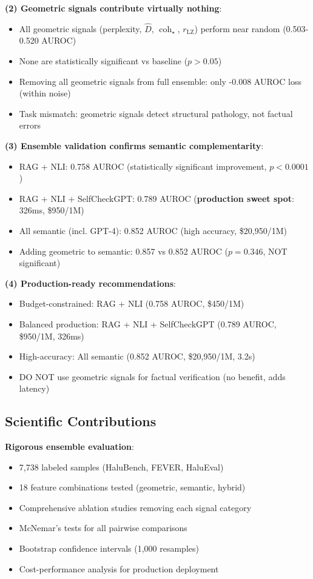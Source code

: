 \documentclass[11pt]{article}
\begin{document}
\textbf{(2) Geometric signals contribute virtually nothing}:
\begin{itemize}
\item All geometric signals (perplexity, $\hat{D}$, $\operatorname{coh}_\star$, $r_{\text{LZ}}$) perform near random (0.503-0.520 AUROC)
\item None are statistically significant vs baseline ($p > 0.05$)
\item Removing all geometric signals from full ensemble: only -0.008 AUROC loss (within noise)
\item Task mismatch: geometric signals detect structural pathology, not factual errors
\end{itemize}

\textbf{(3) Ensemble validation confirms semantic complementarity}:
\begin{itemize}
\item RAG + NLI: 0.758 AUROC (statistically significant improvement, $p < 0.0001$)
\item RAG + NLI + SelfCheckGPT: 0.789 AUROC (\textbf{production sweet spot}: 326ms, \$950/1M)
\item All semantic (incl. GPT-4): 0.852 AUROC (high accuracy, \$20,950/1M)
\item Adding geometric to semantic: 0.857 vs 0.852 AUROC ($p=0.346$, NOT significant)
\end{itemize}

\textbf{(4) Production-ready recommendations}:
\begin{itemize}
\item Budget-constrained: RAG + NLI (0.758 AUROC, \$450/1M)
\item Balanced production: RAG + NLI + SelfCheckGPT (0.789 AUROC, \$950/1M, 326ms)
\item High-accuracy: All semantic (0.852 AUROC, \$20,950/1M, 3.2s)
\item DO NOT use geometric signals for factual verification (no benefit, adds latency)
\end{itemize}

\subsection{Scientific Contributions}

\textbf{Rigorous ensemble evaluation}:
\begin{itemize}
\item 7,738 labeled samples (HaluBench, FEVER, HaluEval)
\item 18 feature combinations tested (geometric, semantic, hybrid)
\item Comprehensive ablation studies removing each signal category
\item McNemar's tests for all pairwise comparisons
\item Bootstrap confidence intervals (1,000 resamples)
\item Cost-performance analysis for production deployment
\end{itemize}
\end{document}

